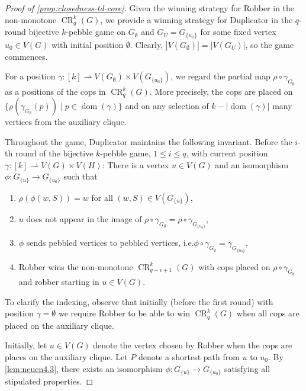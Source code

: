 \documentclass[10pt,a4paper]{article}
\DeclareMathOperator{\CR}{CR}
\DeclareMathOperator{\dom}{dom}
\begin{document}
\begin{proof}[Proof of \cref{prop:closedness-td-core}]
	Given the winning strategy for Robber in the non-monotone $\CR^k_q(G)$, we provide a winning strategy for Duplicator in the $q$-round bijective $k$-pebble game on $G_\emptyset$ and $G_U = G_{\{u_0\}}$ for some fixed vertex $u_0 \in V(G)$ with initial position $\emptyset$. Clearly, $|V(G_\emptyset)| = |V(G_U)|$, so the game commences.

	For a position $\gamma \colon [k] \rightharpoonup V(G_\emptyset) \times V(G_{\{u_0\}})$, we regard the partial map $\rho \circ \gamma_{G_\emptyset}$ as a positions of the cops in $\CR^k_q(G)$. More precisely, the cops are placed on $\{\rho(\gamma_{G_\emptyset}(p)) \mid p \in \dom(\gamma)\}$ and on any selection of $k - |\dom(\gamma)|$ many  vertices from the auxiliary clique.

		
	Throughout the game, Duplicator maintains the following invariant. Before the $i$-th round of the bijective $k$-pebble game, $1 \leq i \leq q$, with current position $\gamma \colon [k] \rightharpoonup V(G) \times V(H)$:
	There is a vertex $u \in V(G)$ and an isomorphism $\phi \colon G_{\{u\}} \to G_{\{u_0\}}$ such that
	\begin{enumerate}[I]
		\item $\rho(\phi(w, S)) = w$ for all $(w, S) \in V(G_{\{u\}})$,\label{inv1}
		\item $u$ does not appear in the image of $\rho \circ \gamma_{G_\emptyset} = \rho \circ \gamma_{G_{\{u_0\}}}$,\label{inv2}
		\item $\phi$ sends pebbled vertices to pebbled vertices, i.e.\@ $\phi \circ \gamma_{G_\emptyset} = \gamma_{G_{\{u_0\}}}$,\label{inv3}
		\item Robber wins the non-monotone $\CR^k_{q-i+1}(G)$ with cops placed on $\rho \circ \gamma_{G_\emptyset}$ and robber starting in $u \in V(G)$.\label{inv4}
	\end{enumerate}

	To clarify the indexing, observe that initially (before the first round) with position $\gamma = \emptyset$ we require Robber to be able to win $\CR^k_q(G)$ when all cops are placed on the auxiliary clique.

	Initially, let $u \in V(G)$ denote the vertex chosen by Robber when the cops are places on the auxiliary clique. 
	Let $P$ denote a shortest path from $u$ to $u_0$.
	By \cref{lem:neuen4.3}, there exists an isomorphism $\phi \colon G_{\{u\}} \to G_{\{u_0\}}$ satisfying all stipulated properties.
	

\end{proof}
\end{document}
